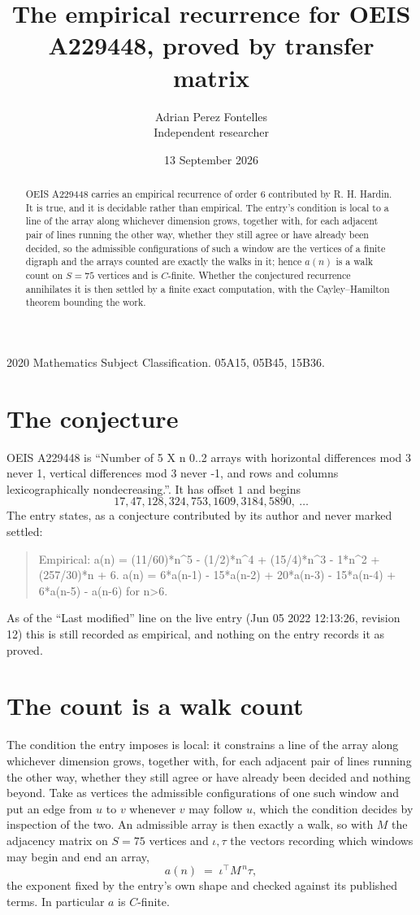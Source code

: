 \documentclass[11pt,a4paper]{article}
\title{The empirical recurrence for OEIS A229448, proved by transfer matrix}
\author{Adrian Perez Fontelles\\ \small Independent researcher}
\date{13 September 2026}
\theoremstyle{plain}
\theoremstyle{definition}
\begin{document}
\maketitle

\begin{abstract}
OEIS A229448 carries an empirical recurrence of order $6$ contributed by R. H. Hardin. It is
true, and it is decidable rather than empirical. The entry's condition is local to a line of the array along whichever dimension grows, together with, for each adjacent pair of lines running the other way, whether they still agree or have already been decided, so
the admissible configurations of such a window are the vertices of a finite digraph and the
arrays counted are exactly the walks in it; hence $a(n)$ is a walk count on $S=75$ vertices
and is $C$-finite. Whether the conjectured recurrence annihilates it is then settled by a
finite exact computation, with the Cayley--Hamilton theorem bounding the work.
\end{abstract}

\noindent\small 2020 Mathematics Subject Classification. 05A15, 05B45, 15B36.\normalsize

\section{The conjecture}

OEIS A229448 is ``Number of 5 X n 0..2 arrays with horizontal differences mod 3 never 1, vertical differences mod 3 never -1, and rows and columns lexicographically nondecreasing.''. It has offset $1$ and begins
\[
17, 47, 128, 324, 753, 1609, 3184, 5890,\ \dots
\]
The entry states, as a conjecture contributed by its author and never marked settled:
\begin{quote}
Empirical: a(n) = (11/60)*n\^{}5 - (1/2)*n\^{}4 + (15/4)*n\^{}3 - 1*n\^{}2 + (257/30)*n + 6. a(n) = 6*a(n-1) - 15*a(n-2) + 20*a(n-3) - 15*a(n-4) + 6*a(n-5) - a(n-6) for n>6.
\end{quote}
As of the ``Last modified'' line on the live entry (Jun 05 2022 12:13:26, revision 12) this is still
recorded as empirical, and nothing on the entry records it as proved.

\section{The count is a walk count}

The condition the entry imposes is local: it constrains a line of the array along whichever dimension grows, together with, for each adjacent pair of lines running the other way, whether they still agree or have already been decided and nothing beyond. Take as
vertices the admissible configurations of one such window and put an edge from $u$ to $v$
whenever $v$ may follow $u$, which the condition decides by inspection of the two. An
admissible array is then exactly a walk, so with $M$ the adjacency matrix on $S=75$ vertices
and $\iota,\tau$ the vectors recording which windows may begin and end an array,
\[
a(n)\;=\;\iota^{\!\top}M^{\,n}\tau ,
\]
the exponent fixed by the entry's own shape and checked against its published terms. In
particular $a$ is $C$-finite.
\end{document}
